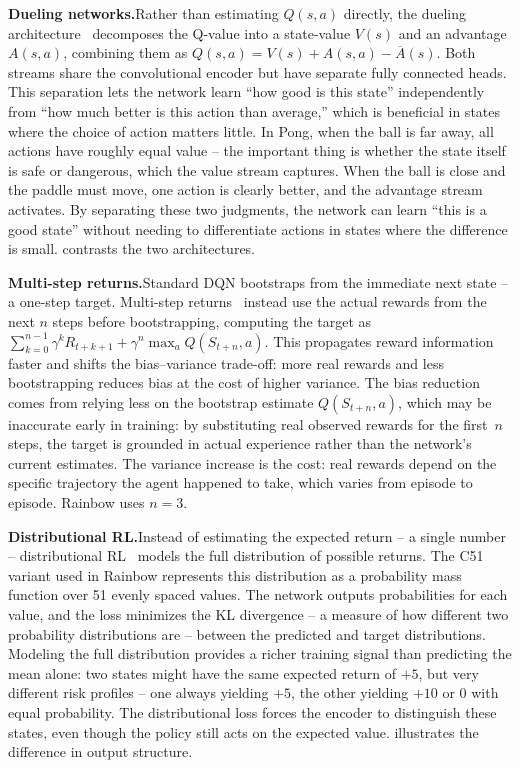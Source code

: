 \smallskip
\textbf{Dueling networks.}\quad Rather than estimating $Q(s, a)$
directly, the dueling architecture~\citep{wang2016dueling}
decomposes the Q-value into a state-value $V(s)$ and an advantage
$A(s, a)$, combining them as
$Q(s, a) = V(s) + A(s, a) - \overline{A}(s)$. Both streams share
the convolutional encoder but have separate fully connected heads.
This separation lets the network learn ``how good is this state''
independently from ``how much better is this action than average,''
which is beneficial in states where the choice of action matters
little. In Pong, when the ball is far away, all actions have
roughly equal value -- the important thing is whether the state
itself is safe or dangerous, which the value stream captures.
When the ball is close and the paddle must move, one action is
clearly better, and the advantage stream activates. By separating
these two judgments, the network can learn ``this is a good state''
without needing to differentiate actions in states where the
difference is small.  contrasts the
two architectures.



\smallskip
\textbf{Multi-step returns.}\quad Standard DQN bootstraps from the
immediate next state -- a one-step target. Multi-step
returns~\citep{sutton2018reinforcement} instead use the actual
rewards from the next $n$ steps before bootstrapping, computing the
target as
$\sum_{k=0}^{n-1} \gamma^k R_{t+k+1}
  + \gamma^n \max_a Q(S_{t+n}, a)$.
This propagates reward information faster and shifts the
bias--variance trade-off: more real rewards and less bootstrapping
reduces bias at the cost of higher variance. The bias reduction
comes from relying less on the bootstrap estimate
$Q(S_{t+n}, a)$, which may be inaccurate early in training: by
substituting real observed rewards for the first~$n$ steps, the
target is grounded in actual experience rather than the network's
current estimates. The variance increase is the cost: real rewards
depend on the specific trajectory the agent happened to take, which
varies from episode to episode. Rainbow uses $n = 3$.

\smallskip
\textbf{Distributional RL.}\quad Instead of estimating the expected
return -- a single number -- distributional
RL~\citep{bellemare2017distributional} models the full distribution
of possible returns. The C51 variant used in Rainbow represents this
distribution as a probability mass function over 51 evenly spaced
values. The network outputs probabilities for each value, and the
loss minimizes the KL divergence -- a measure of how different two
probability distributions are -- between the predicted and target
distributions. Modeling the full distribution provides a richer
training signal than predicting the mean alone: two states might
have the same expected return of $+5$, but very different risk
profiles -- one always yielding $+5$, the other yielding $+10$ or
$0$ with equal probability. The distributional loss forces the
encoder to distinguish these states, even though the policy still
acts on the expected value.
 illustrates the difference in
output structure.


